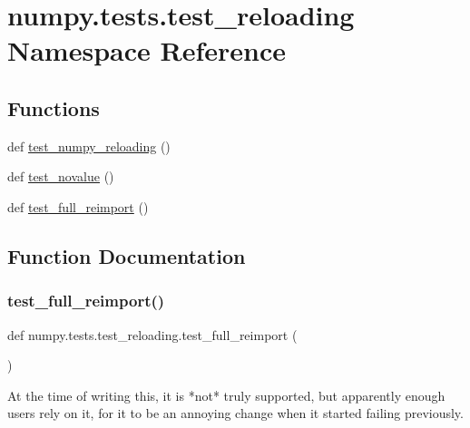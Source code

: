 \hypertarget{namespacenumpy_1_1tests_1_1test__reloading}{}\section{numpy.\+tests.\+test\+\_\+reloading Namespace Reference}
\label{namespacenumpy_1_1tests_1_1test__reloading}
\subsection*{Functions}
\begin{DoxyCompactItemize}
\item 
def \hyperlink{namespacenumpy_1_1tests_1_1test__reloading_af82d168b5686ca06808e6db5723b9984}{test\+\_\+numpy\+\_\+reloading} ()
\item 
def \hyperlink{namespacenumpy_1_1tests_1_1test__reloading_ac296aa54b587418181b17c3d413fced2}{test\+\_\+novalue} ()
\item 
def \hyperlink{namespacenumpy_1_1tests_1_1test__reloading_a18152e39c72c92fbc323c4875f2971ea}{test\+\_\+full\+\_\+reimport} ()
\end{DoxyCompactItemize}


\subsection{Function Documentation}
\mbox{\label{namespacenumpy_1_1tests_1_1test__reloading_a18152e39c72c92fbc323c4875f2971ea}} 
\subsubsection{\texorpdfstring{test\+\_\+full\+\_\+reimport()}{test\_full\_reimport()}}
{\footnotesize\ttfamily def numpy.\+tests.\+test\+\_\+reloading.\+test\+\_\+full\+\_\+reimport (\begin{DoxyParamCaption}{ }\end{DoxyParamCaption})}

\begin{DoxyVerb}At the time of writing this, it is *not* truly supported, but
apparently enough users rely on it, for it to be an annoying change
when it started failing previously.
\end{DoxyVerb}
 \mbox{\label{namespacenumpy_1_1tests_1_1test__reloading_ac296aa54b587418181b17c3d413fced2}} 
